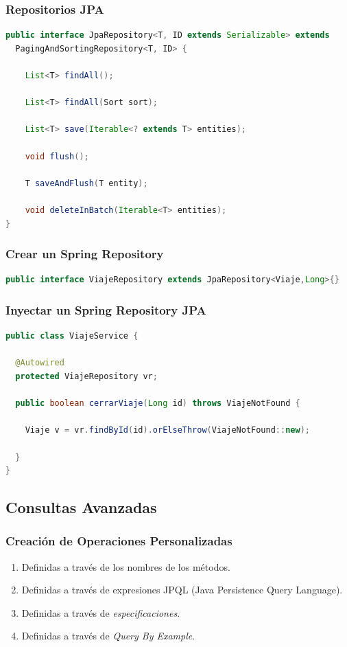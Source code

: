 \documentclass[a4paper,slidestop,xcolor=pst,blue]{beamer}
\begin{document}
\begin{frame}[c,fragile]
    \frametitle{Repositorios JPA}
    \begin{lstlisting}[basicstyle=\footnotesize,language=Java]
public interface JpaRepository<T, ID extends Serializable> extends
  PagingAndSortingRepository<T, ID> {

    List<T> findAll();

    List<T> findAll(Sort sort);

    List<T> save(Iterable<? extends T> entities);

    void flush();

    T saveAndFlush(T entity);

    void deleteInBatch(Iterable<T> entities);
}
    \end{lstlisting}
\end{frame}

\begin{frame}[c,fragile]
    \frametitle{Crear un Spring Repository}
\begin{lstlisting}[basicstyle=\small,language=Java]
public interface ViajeRepository extends JpaRepository<Viaje,Long>{}
\end{lstlisting}
\end{frame}

\begin{frame}[c,fragile]
    \frametitle{Inyectar un Spring Repository JPA}
\begin{lstlisting}[basicstyle=\footnotesize,language=Java]
public class ViajeService {
	
  @Autowired
  protected ViajeRepository vr;	

  public boolean cerrarViaje(Long id) throws ViajeNotFound {
		
    Viaje v = vr.findById(id).orElseThrow(ViajeNotFound::new);
		
  }
}
\end{lstlisting}
\end{frame}

\subsection{Consultas Avanzadas}

\begin{frame}[c]
    \frametitle{Creación de Operaciones Personalizadas}
    \begin{enumerate}[<+->]
        \item Definidas a través de los nombres de los métodos.
        \item Definidas a través de expresiones JPQL (Java Persistence Query Language).
        \item Definidas a través de \emph{especificaciones}.
        \item Definidas a través de \emph{Query By Example}.
    \end{enumerate}
\end{frame}
\end{document}
